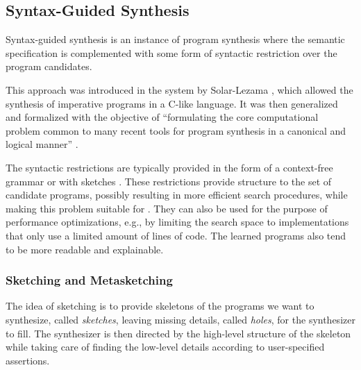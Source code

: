 \subsection{Syntax-Guided Synthesis}
\label{sec:sygus}


Syntax-guided synthesis is an instance of program synthesis where the semantic
specification is complemented with some form of syntactic restriction over the
program candidates.

This approach was introduced in the  system by Solar-Lezama \cite{Solar-Lezama:2008}, which allowed the
synthesis of imperative programs in a C-like language.
It was then generalized and formalized with the objective of ``formulating the
core computational problem common to many recent tools for program synthesis in
a canonical and logical manner'' \cite{Alur:sygus:2013}.

The syntactic restrictions are typically provided in the form of a context-free
grammar \cite{Alur:sygus:2013} or with sketches \cite{Solar-Lezama:2008}.
These restrictions provide structure to the set of candidate programs, possibly
resulting in more efficient search procedures, while making this problem
suitable for  \cite{Alur:sygus:2013}. They can also be used for the purpose of
performance optimizations, e.g., by limiting the search space to implementations
that only use a limited amount of lines of code.
The learned programs also tend to be more readable and explainable.


\subsubsection{Sketching and Metasketching}
\label{sec:sketching}


The idea of sketching is to provide skeletons of the programs we want to
synthesize, called \textit{sketches}, leaving missing details, called
\textit{holes}, for the synthesizer to fill.
The synthesizer is then directed by the high-level structure of the skeleton
while taking care of finding the low-level details according to user-specified
assertions.

